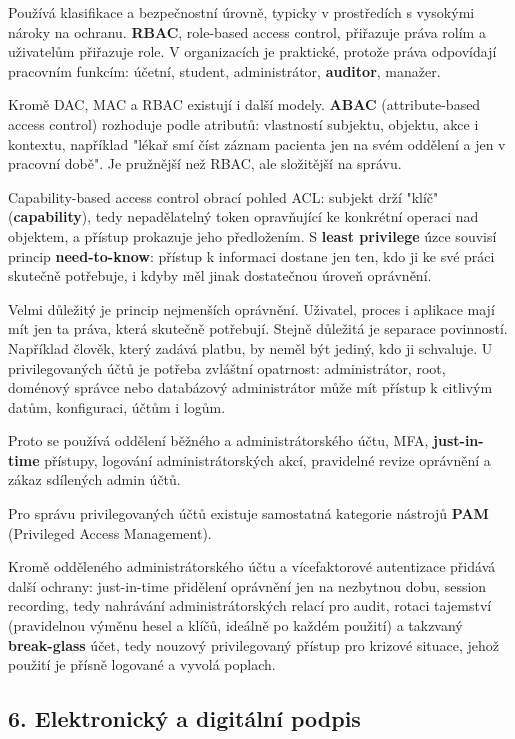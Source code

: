\documentclass[11pt,a4paper]{article}
\begin{document}
Používá klasifikace a bezpečnostní úrovně, typicky v prostředích s vysokými nároky na ochranu. \textbf{RBAC}, role-based access control, přiřazuje práva rolím a uživatelům přiřazuje role. V organizacích je praktické, protože práva odpovídají pracovním funkcím: účetní, student, administrátor, \textbf{auditor}, manažer.

Kromě DAC, MAC a RBAC existují i další modely. \textbf{ABAC} (attribute-based access control) rozhoduje podle atributů: vlastností subjektu, objektu, akce i kontextu, například "lékař smí číst záznam pacienta jen na svém oddělení a jen v pracovní době". Je pružnější než RBAC, ale složitější na správu.

Capability-based access control obrací pohled ACL: subjekt drží "klíč" (\textbf{capability}), tedy nepadělatelný token opravňující ke konkrétní operaci nad objektem, a přístup prokazuje jeho předložením. S \textbf{least privilege} úzce souvisí princip \textbf{need-to-know}: přístup k informaci dostane jen ten, kdo ji ke své práci skutečně potřebuje, i kdyby měl jinak dostatečnou úroveň oprávnění.

Velmi důležitý je princip nejmenších oprávnění. Uživatel, proces i aplikace mají mít jen ta práva, která skutečně potřebují. Stejně důležitá je separace povinností. Například člověk, který zadává platbu, by neměl být jediný, kdo ji schvaluje. U privilegovaných účtů je potřeba zvláštní opatrnost: administrátor, root, doménový správce nebo databázový administrátor může mít přístup k citlivým datům, konfiguraci, účtům i logům.

Proto se používá oddělení běžného a administrátorského účtu, MFA, \textbf{just-in-time} přístupy, logování administrátorských akcí, pravidelné revize oprávnění a zákaz sdílených admin účtů.

Pro správu privilegovaných účtů existuje samostatná kategorie nástrojů \textbf{PAM} (Privileged Access Management).

Kromě odděleného administrátorského účtu a vícefaktorové autentizace přidává další ochrany: just-in-time přidělení oprávnění jen na nezbytnou dobu, session recording, tedy nahrávání administrátorských relací pro audit, rotaci tajemství (pravidelnou výměnu hesel a klíčů, ideálně po každém použití) a takzvaný \textbf{break-glass} účet, tedy nouzový privilegovaný přístup pro krizové situace, jehož použití je přísně logované a vyvolá poplach.

\subsection*{6. Elektronický a digitální podpis}
\end{document}
